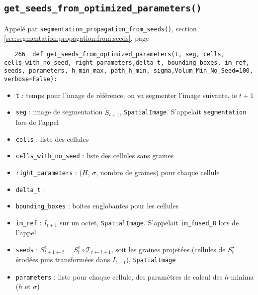 \documentclass{article}
\def \mycolor {red}
\begin{document}
\subsection{\texttt{get\_seeds\_from\_optimized\_parameters()}}
\label{sec:get:seeds:from:optimized:parameters}
Appel\'e par \texttt{segmentation\_propagation\_from\_seeds()},
section \ref{sec:segmentation:propagation:from:seeds}, page \pageref{sec:segmentation:propagation:from:seeds}
\begin{verbatim}
   266	def get_seeds_from_optimized_parameters(t, seg, cells, cells_with_no_seed, right_parameters,delta_t, bounding_boxes, im_ref, seeds, parameters, h_min_max, path_h_min, sigma,Volum_Min_No_Seed=100, verbose=False):
\end{verbatim} 
\color{\mycolor}
\begin{itemize}
\itemsep -1ex
\item \verb|t| : temps pour l'image de r\'ef\'erence, on va segmenter l'image suivante, ie $t+1$
\item \verb|seg| :  image de segmentation $\tilde{S}_{t+1}$, \texttt{SpatialImage}. S'appelait \verb|segmentation|  lors de l'appel
\item \verb|cells| : liste des cellules
\item \verb|cells_with_no_seed| : liste des cellules sans graines
\item \verb|right_parameters| : ($H$, $\sigma$, nombre de graines) pour chaque cellule
\item \verb|delta_t| :
\item \verb|bounding_boxes| : boites englobantes pour les cellules
\item \verb|im_ref| : $I_{t+1}$ sur un octet, \texttt{SpatialImage}. S'appelait \verb|im_fused_8|  lors de l'appel
\item \verb|seeds| : $S^e_{t+1 \leftarrow t} = S^e_t \circ \mathcal{T}_{t \leftarrow t+1}$, soit les graines projet\'ees (cellules de $S^{\star}_t$ \'erod\'ees puis transform\'ees dans $I_{t+1}$), \texttt{SpatialImage}
\item \verb|parameters| : liste pour chaque cellule,  des param\`etres de calcul des $h$-minima ($h$ et $\sigma$)
\end{itemize}
\color{black}
\end{document}
